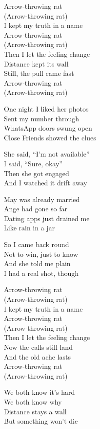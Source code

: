 \begin{lyrics}
Arrow-throwing rat\\
(Arrow-throwing rat)\\
I kept my truth in a name\\
Arrow-throwing rat\\
(Arrow-throwing rat)\\
Then I let the feeling change\\
Distance kept its wall\\
Still, the pull came fast\\
Arrow-throwing rat\\
(Arrow-throwing rat)

One night I liked her photos\\
Sent my number through\\
WhatsApp doors swung open\\
Close Friends showed the clues

She said, “I’m not available”\\
I said, “Sure, okay”\\
Then she got engaged\\
And I watched it drift away

May was already married\\
Ange had gone so far\\
Dating apps just drained me\\
Like rain in a jar

So I came back round\\
Not to win, just to know\\
And she told me plain\\
I had a real shot, though

Arrow-throwing rat\\
(Arrow-throwing rat)\\
I kept my truth in a name\\
Arrow-throwing rat\\
(Arrow-throwing rat)\\
Then I let the feeling change\\
Now the calls still land\\
And the old ache lasts\\
Arrow-throwing rat\\
(Arrow-throwing rat)

We both know it’s hard\\
We both know why\\
Distance stays a wall\\
But something won’t die

\end{lyrics}

